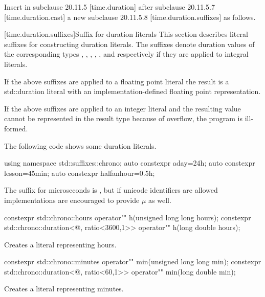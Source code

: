 \documentclass[ebook,11pt,article]{memoir}
\begin{document}
Insert in subclause 20.11.5 [time.duration] after subclause 20.11.5.7 [time.duration.cast] a new subclause 20.11.5.8 [time.duration.suffixes] as follows.

[time.duration.suffixes]{Suffix for duration literals}
\pnum
This section describes literal suffixes for constructing duration literals. The suffixes  denote duration values of the corresponding types , , , , , and  respectively if they are applied to integral literals. 

\pnum
If the above suffixes are applied to a floating point literal the result is a std::duration literal with an implementation-defined floating point representation.

\pnum
If the above suffixes are applied to an integer literal and the resulting  value cannot be represented in the result type because of overflow, the program is ill-formed.

\pnum
\enterexample 
The following code shows some duration literals.
\begin{codeblock}
{
    using namespace std::suffixes::chrono;
    auto constexpr aday=24h; 
    auto constexpr lesson=45min; 
    auto constexpr halfanhour=0.5h;
}
\end{codeblock}
\exitexample

\pnum
\enternote
The suffix for microseconds is , but if unicode identifiers are allowed implementations are encouraged to provide $\mu{}$ as well.
\exitnote

\begin{itemdecl}
constexpr 
std::chrono::hours operator"" h(unsigned long long hours);
constexpr 
std::chrono::duration<@\seebelow@, ratio<3600,1>> operator"" h(long double hours);
\end{itemdecl}

\begin{itemdescr}
\pnum
\effects
Creates a  literal representing  hours.
\end{itemdescr}

\begin{itemdecl}
constexpr 
std::chrono::minutes operator"" min(unsigned long long min);
constexpr 
std::chrono::duration<@\seebelow@, ratio<60,1>> operator"" min(long double min);
\end{itemdecl}

\begin{itemdescr}
\pnum
\effects
Creates a  literal representing  minutes.
\end{itemdescr}
\end{document}

